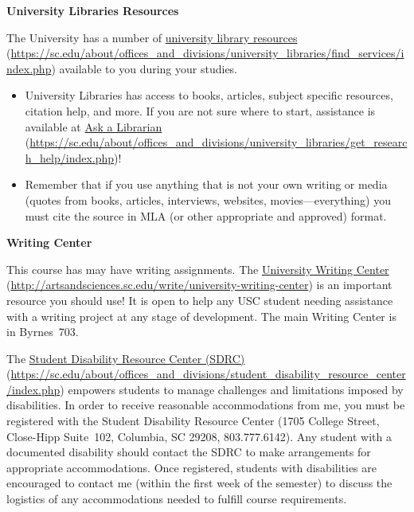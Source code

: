 \documentclass[11pt,letterpaper]{article}
\begin{document}
{\bfseries University Libraries Resources} \par
The University has a number of \href{https://sc.edu/about/offices\_and\_divisions/university\_libraries/find\_services/index.php}{university library resources} (\url{https://sc.edu/about/offices\_and\_divisions/university\_libraries/find\_services/index.php}) available to you during your studies.
	\begin{itemize}
	\item University Libraries has access to books, articles, subject specific resources, citation help, and more. If you are not sure where to start, assistance is available at \href{https://sc.edu/about/offices\_and\_divisions/university\_libraries/get\_research\_help/index.php}{Ask a Librarian} (\url{https://sc.edu/about/offices\_and\_divisions/university\_libraries/get\_research\_help/index.php})!
	\item Remember that if you use anything that is not your own writing or media (quotes from books, articles, interviews, websites, movies---everything) you must cite the source in MLA (or other appropriate and approved) format.
	\end{itemize} \pvspace{0.1cm}

{\bfseries Writing Center} \par
This course has may have writing assignments. The \href{http://artsandsciences.sc.edu/write/university-writing-center}{University Writing Center} (\url{http://artsandsciences.sc.edu/write/university-writing-center}) is an important resource you should use! It is open to help any USC student needing assistance with a writing project at any stage of development. The main Writing Center is in Byrnes~703. \sectionbreak




The \href{https://sc.edu/about/offices\_and\_divisions/student\_disability\_resource\_center/index.php}{Student Disability Resource Center (SDRC)} (\url{https://sc.edu/about/offices\_and\_divisions/student\_disability\_resource\_center/index.php}) empowers students to manage challenges and limitations imposed by disabilities. In order to receive reasonable accommodations from me, you must be registered with the Student Disability Resource Center (1705 College Street, Close-Hipp Suite~102, Columbia, SC 29208, 803.777.6142). Any student with a documented disability should contact the SDRC to make arrangements for appropriate accommodations. Once registered, students with disabilities are encouraged to contact me (within the first week of the semester) to discuss the logistics of any accommodations needed to fulfill course requirements. \sectionbreak
\end{document}
